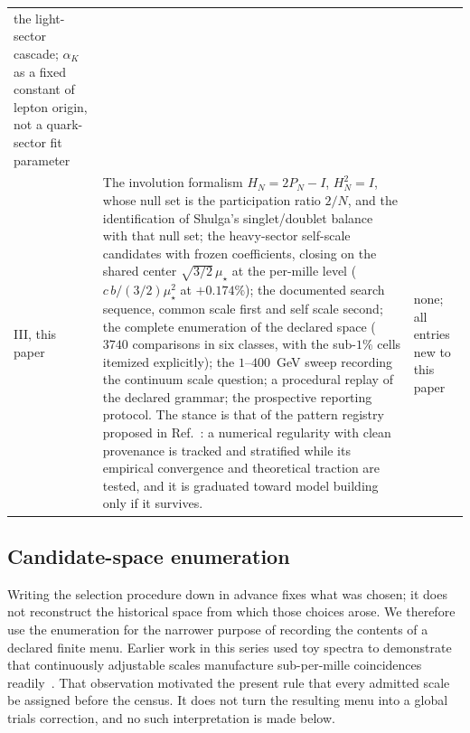 \documentclass[aps,twocolumn,superscriptaddress,nofootinbib,floatfix]{revtex4-2}
\newcommand{\mstar}{\mu_\star}
\newcommand{\alphaK}{\alpha_K}
\begin{document}
\begin{table}[t]
\begin{ruledtabular}
\begin{tabular}{p{}p{}p{}}
the light-sector cascade; $\alphaK$ as a fixed constant of lepton origin, not a quark-sector fit parameter \\
III, this paper &
The involution formalism $H_N=2P_N-I$, $H_N^2=I$, whose null set is the participation ratio $2/N$, and the identification of Shulga's singlet/doublet balance with that null set; the heavy-sector self-scale candidates with frozen coefficients, closing on the shared center $\sqrt{3/2}\,\mstar$ at the per-mille level ($c\,b/(3/2)\mstar^2$ at $+0.174\%$); the documented search sequence, common scale first and self scale second; the complete enumeration of the declared space ($3740$ comparisons in six classes, with the sub-$1\%$ cells itemized explicitly); the $1$--$400$~GeV sweep recording the continuum scale question; a procedural replay of the declared grammar; the prospective reporting protocol. The stance is that of the pattern registry proposed in Ref.~\cite{BrilliantPattern}: a numerical regularity with clean provenance is tracked and stratified while its empirical convergence and theoretical traction are tested, and it is graduated toward model building only if it survives. &
none; all entries new to this paper \\
\end{tabular}
\end{ruledtabular}
\end{table}

\subsection{Candidate-space enumeration}
\label{sec:enum}

Writing the selection procedure down in advance fixes what was chosen; it does not reconstruct the historical space from which those choices arose. We therefore use the enumeration for the narrower purpose of recording the contents of a declared finite menu. Earlier work in this series used toy spectra to demonstrate that continuously adjustable scales manufacture sub-per-mille coincidences readily~\cite{BrilliantAPPB}. That observation motivated the present rule that every admitted scale be assigned before the census. It does not turn the resulting menu into a global trials correction, and no such interpretation is made below.
\end{document}
